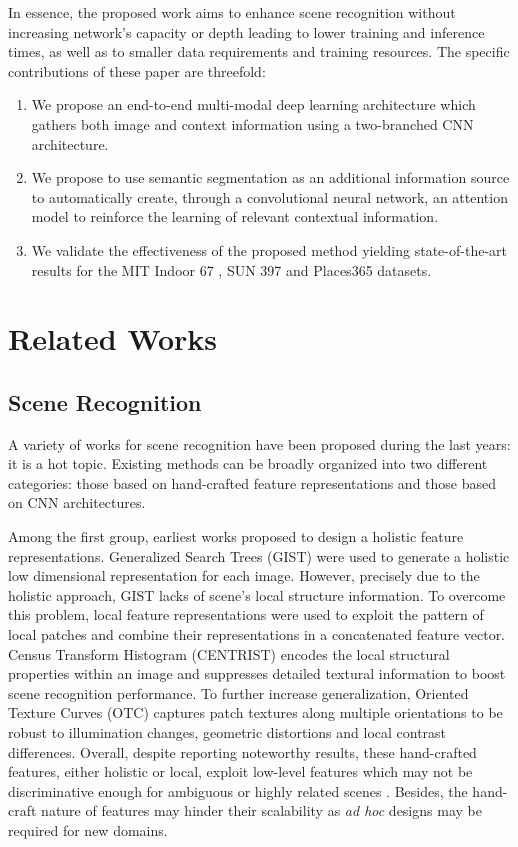 \documentclass[review, 3p, sort&compress]{elsarticle}
\begin{document}
In essence, the proposed work aims to enhance scene recognition without increasing network's capacity or depth leading to lower training and inference times, as well as to smaller data requirements and training resources. The specific contributions of these paper are threefold:
\begin{enumerate}
  \item We propose an end-to-end multi-modal deep learning architecture which gathers both image and context information using a two-branched CNN architecture.
  \item We propose to use semantic segmentation as an additional information source to automatically create, through a convolutional neural network, an attention model to reinforce the learning of relevant contextual information.
  \item We validate the effectiveness of the proposed method yielding state-of-the-art results for the MIT Indoor 67 \cite{quattoni2009recognizing}, SUN 397 \cite{xiao2010sun} and Places365 \cite{zhou2018places} datasets.
\end{enumerate}


\section{Related Works} \label{sec:State of the Art}

\subsection{Scene Recognition}
A variety of works for scene recognition have been proposed during the last years: it is a hot topic. Existing methods can be broadly organized into two different categories: those based on hand-crafted feature representations and those based on CNN architectures. 

Among the first group, earliest works proposed to design a holistic feature representations. Generalized Search Trees (GIST) \cite{oliva2005gist} were used to generate a holistic low dimensional representation for each image. However, precisely due to the holistic approach, GIST lacks of scene's local structure information. To overcome this problem, local feature representations were used to exploit the pattern of local patches and combine their representations in a concatenated feature vector. Census Transform Histogram (CENTRIST) \cite{wu2011centrist} encodes the local structural properties within an image and suppresses detailed textural information to boost scene recognition performance. To further increase generalization, Oriented Texture Curves (OTC) \cite{margolin2014otc} captures patch textures along multiple orientations to be robust to illumination changes, geometric distortions and local contrast differences. Overall, despite reporting noteworthy results, these hand-crafted features, either holistic or local, exploit low-level features which may not be discriminative enough for ambiguous or highly related scenes \cite{zhou2018places}. Besides, the hand-craft nature of features may hinder their scalability as \textit{ad hoc} designs may be required for new domains.
\end{document}

